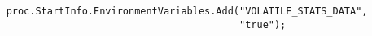 \begin{verbatim}
    proc.StartInfo.EnvironmentVariables.Add("VOLATILE_STATS_DATA", 
                                            "true");
\end{verbatim}